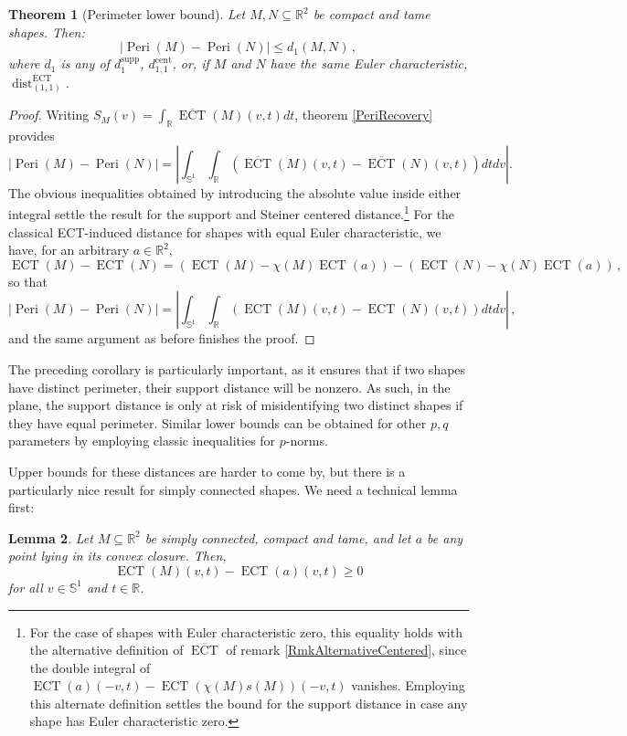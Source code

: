 \documentclass[a4paper]{article}
\newtheorem{theorem}{Theorem}[section]
\newtheorem{lemma}[theorem]{Lemma}
\newcommand{\ECT}{\operatorname{ECT}}
\newcommand{\bb}{\mathbb}
\newcommand{\dist}[2]{\operatorname{dist}^{\operatorname{ECT}}_{(#1, #2)}}
\newcommand{\Peri}{\operatorname{Peri}}
\newcommand{\dsupp}{d^{\operatorname{supp}}}
\newcommand{\dcent}{d^{\operatorname{cent}}}
\begin{document}
\begin{theorem}[Perimeter lower bound]
	\label{PeriLowBound}
	Let $M, N \subseteq \bb R^2$ be compact and tame shapes. Then:
	\[ |\Peri(M)-\Peri(N)|\leq d_1(M,N)\, ,  \]
	where $d_1$ is any of $\dsupp_1$, $\dcent_{1,1}$, or, if $M$ and $N$ have the same Euler characteristic, $\dist{1}{1}$.
\end{theorem}

\begin{proof}
	Writing $S_M(v)= \int_{\bb R} \overline{\ECT}(M)(v,t) dt$, theorem \ref{PeriRecovery} provides
	\[ |\Peri(M)-\Peri(N)|=\left| \int_{\bb S^1} \int_{\bb R} (\overline{\ECT}(M)(v,t)- \overline{\ECT}(N)(v,t) )dt dv\right|. \]
	The obvious inequalities obtained by introducing the absolute value inside either integral settle the result for the support and Steiner centered distance.\footnote{For the case of shapes with Euler characteristic zero, this equality holds with the alternative definition of $\overline{\ECT}$ of remark \ref{RmkAlternativeCentered}, since the double integral of $\ECT(a)(-v,t)-\ECT(\chi(M)s(M))(-v,t)$ vanishes. Employing this alternate definition settles the bound for the support distance in case any shape has Euler characteristic zero.} For the classical ECT-induced distance for shapes with equal Euler characteristic, we have, for an arbitrary $a \in \bb R^2$, \[\ECT(M)-\ECT(N)=(\ECT(M)-\chi(M)\ECT(a))-(\ECT(N)-\chi(N)\ECT(a)) \, ,\]
	so that
	\[ |\Peri(M)-\Peri(N)| =\left| \int_{\bb S^1} \int_{\bb R} ({\ECT}(M)(v,t)- {\ECT}(N)(v,t) )dt dv\right| \, ,\]
	and the same argument as before finishes the proof.
\end{proof}

The preceding corollary is particularly important, as it ensures that if two shapes have distinct perimeter, their support distance will be nonzero. As such, in the plane, the support distance is only at risk of misidentifying two distinct shapes if they have equal perimeter. Similar lower bounds can be obtained for other $p,q$ parameters by employing classic inequalities for $p$-norms.

Upper bounds for these distances are harder to come by, but there is a particularly nice result for simply connected shapes. We need a technical lemma first:
\begin{lemma}
	\label{SimpCompPositive}
	Let $M \subseteq \bb R^2$ be simply connected, compact and tame, and let $a$ be any point lying in its convex closure. Then,
	\[ \ECT(M)(v,t)-\ECT(a)(v,t) \geq 0 \]
	for all $v \in \bb S^1$ and $t \in \bb R$.
\end{lemma}
\end{document}
